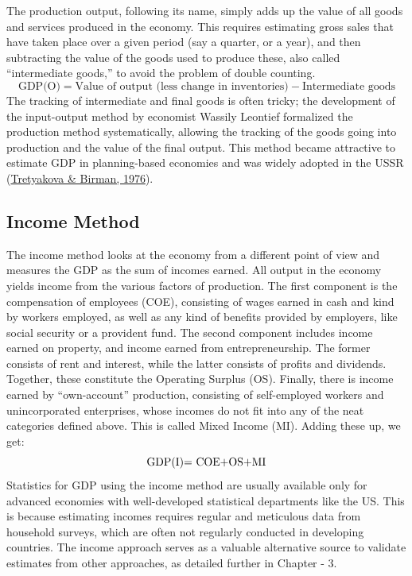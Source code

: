 \documentclass[12pt,nobind, a4paper]{reedthesis}
\begin{document}
 The production output, following its name, simply adds up the value of all goods and services produced in the economy. This requires estimating gross sales that have taken place over a given period (say a quarter, or a year), and then subtracting the value of the goods used to produce these, also called ``intermediate goods,'' to avoid the problem of double counting.
 \begin{equation}
 \text{GDP(O)}= \text{Value of output (less change in inventories)} - \text{Intermediate goods}
 \end{equation}
 The tracking of intermediate and final goods is often tricky; the development of the input-output method by economist Wassily Leontief formalized the production method systematically, allowing the tracking of the goods going into production and the value of the final output. This method became attractive to estimate GDP in planning-based economies and was widely adopted in the USSR (\protect\hyperlink{ref-tretyakova_input-output_1976}{Tretyakova \& Birman, 1976}).

 \hypertarget{income-method}{%
 \subsection{Income Method}\label{income-method}}

 The income method looks at the economy from a different point of view and measures the GDP as the sum of incomes earned. All output in the economy yields income from the various factors of production. The first component is the compensation of employees (COE), consisting of wages earned in cash and kind by workers employed, as well as any kind of benefits provided by employers, like social security or a provident fund. The second component includes income earned on property, and income earned from entrepreneurship. The former consists of rent and interest, while the latter consists of profits and dividends. Together, these constitute the Operating Surplus (OS). Finally, there is income earned by ``own-account'' production, consisting of self-employed workers and unincorporated enterprises, whose incomes do not fit into any of the neat categories defined above. This is called Mixed Income (MI). Adding these up, we get:
 \begin{equation}
 \text{GDP(I)= \text{COE}+\text{OS}+\text{MI}}
 \end{equation}
 Statistics for GDP using the income method are usually available only for advanced economies with well-developed statistical departments like the US. This is because estimating incomes requires regular and meticulous data from household surveys, which are often not regularly conducted in developing countries. The income approach serves as a valuable alternative source to validate estimates from other approaches, as detailed further in Chapter - 3.
\end{document}
